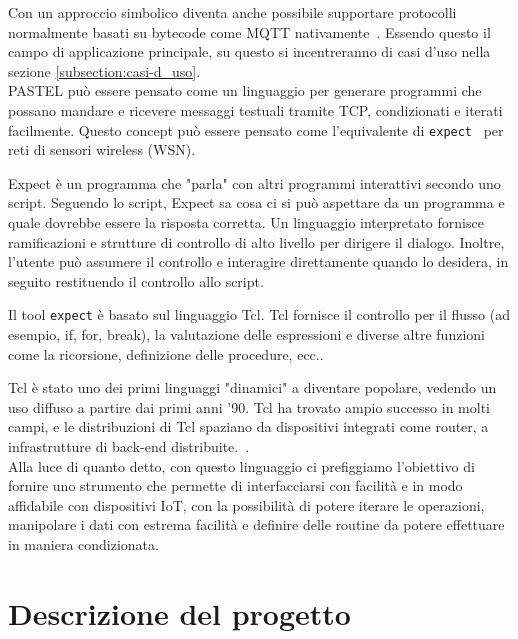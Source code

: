 \documentclass[10pt]{article}
\begin{document}
Con un approccio simbolico diventa anche possibile supportare protocolli normalmente basati su bytecode come MQTT nativamente~\cite{gaglio19interoperable}.
Essendo questo il campo di applicazione principale, su questo si incentreranno di casi d'uso nella sezione \ref{subsection:casi-d_uso}.\\



PASTEL può essere pensato come un linguaggio per generare programmi che possano mandare e ricevere messaggi testuali tramite TCP, condizionati e iterati facilmente. Questo concept può essere pensato come l'equivalente di \texttt{expect}~\cite{libes1991expect, libes1990expect, libes1995exploring} per reti di sensori wireless (WSN).

Expect è un programma che "parla" con altri programmi interattivi secondo uno script. Seguendo lo script, Expect sa cosa ci si può aspettare da un programma e quale dovrebbe essere la risposta corretta. Un linguaggio interpretato fornisce ramificazioni e strutture di controllo di alto livello per dirigere il dialogo. Inoltre, l'utente può assumere il controllo e interagire direttamente quando lo desidera, in seguito restituendo il controllo allo script.

Il tool \texttt{expect} è basato sul linguaggio Tcl. Tcl fornisce il controllo per il flusso (ad esempio, if, for, break), la valutazione delle espressioni e diverse altre funzioni come la ricorsione, definizione delle procedure, ecc.. 

Tcl è stato uno dei primi linguaggi "dinamici" a diventare popolare, vedendo un uso diffuso a partire dai primi anni '90. Tcl ha trovato ampio successo in molti campi, e le distribuzioni di Tcl spaziano da dispositivi integrati come router, a infrastrutture di back-end distribuite.~\cite{nadkarni2017tcl}.\\

Alla luce di quanto detto, con questo linguaggio ci prefiggiamo l'obiettivo di fornire uno strumento che permette di interfacciarsi con facilità e in modo affidabile con dispositivi IoT, con la possibilità di potere iterare le operazioni, manipolare i dati con estrema facilità e definire delle routine da potere effettuare in maniera condizionata.



\section{Descrizione del progetto}\label{section:descrizione}
\end{document}
